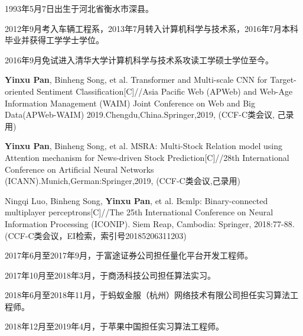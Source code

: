\begin{resume}


  1993年5月7日出生于河北省衡水市深县。

  2012年9月考入车辆工程系，2013年7月转入计算机科学与技术系，2016年7月本科毕业并获得工学学士学位。

  2016年9月免试进入清华大学计算机科学与技术系攻读工学硕士学位至今。


  \begin{publications}[before=\publicationskip,after=\publicationskip]
    \item \textbf{Yinxu Pan}, Binheng Song, et al. Transformer and Multi-scale CNN for Target-oriented Sentiment Classification[C]//Asia Pacific Web (APWeb) and Web-Age Information Management (WAIM) Joint Conference on Web and Big Data(APWeb-WAIM) 2019.Chengdu,China.Springer,2019, (CCF-C类会议, 己录用)
    \item \textbf{Yinxu Pan}, Binheng Song, et al. MSRA: Multi-Stock Relation model using Attention mechanism for News-driven Stock Prediction[C]//28th International Conference on Artificial Neural Networks (ICANN).Munich,German:Springer,2019, (CCF-C类会议,己录用)
    \item Ningqi Luo, Binheng Song, \textbf{Yinxu Pan}, et al. Bcmlp: Binary-connected multiplayer perceptrons[C]//The 25th International Conference on Neural Information Processing (ICONIP). Siem Reap, Cambodia: Springer, 2018:77-88. (CCF-C类会议，EI检索，索引号20185206311203)
  \end{publications}



  \begin{achievements}
    \item 2017年6月至2017年9月，于富途证券公司担任量化平台开发工程师。
    \item 2017年10月至2018年3月，于商汤科技公司担任算法实习。
    \item 2018年6月至2018年11月，于蚂蚁金服（杭州）网络技术有限公司担任实习算法工程师。
    \item 2018年12月至2019年4月，于苹果中国担任实习算法工程师。
  \end{achievements}

\end{resume}
